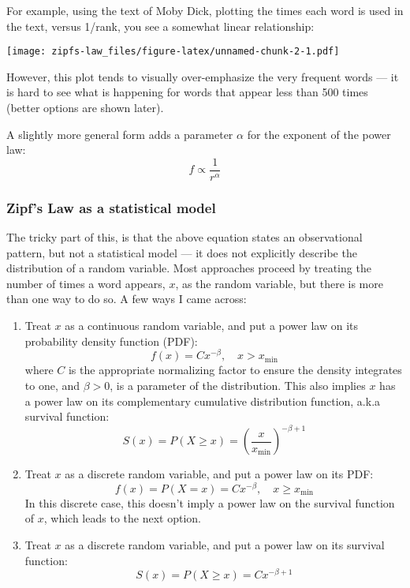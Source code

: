 \documentclass[]{article}
\newenvironment{Shaded}{\begin{snugshade}}{\end{snugshade}}
\newcommand{\DecValTok}[1]{\textcolor[rgb]{0.00,0.00,0.81}{#1}}
\newcommand{\KeywordTok}[1]{\textcolor[rgb]{0.13,0.29,0.53}{\textbf{#1}}}
\newcommand{\NormalTok}[1]{#1}
\newcommand{\OperatorTok}[1]{\textcolor[rgb]{0.81,0.36,0.00}{\textbf{#1}}}
\newcommand{\StringTok}[1]{\textcolor[rgb]{0.31,0.60,0.02}{#1}}
\begin{document}
For example, using the text of Moby Dick, plotting the times each word
is used in the text, versus 1/rank, you see a somewhat linear
relationship:

\begin{Shaded}
\end{Shaded}

\texttt{[image: zipfs-law\_files/figure-latex/unnamed-chunk-2-1.pdf]}

However, this plot tends to visually over-emphasize the very frequent
words --- it is hard to see what is happening for words that appear less
than 500 times (better options are shown later).

A slightly more general form adds a parameter \(\alpha\) for the
exponent of the power law: \[
f \propto \frac{1}{r^\alpha}
\]

\hypertarget{zipfs-law-as-a-statistical-model}{%
\subsubsection{Zipf's Law as a statistical
model}\label{zipfs-law-as-a-statistical-model}}

The tricky part of this, is that the above equation states an
observational pattern, but not a statistical model --- it does not
explicitly describe the distribution of a random variable. Most
approaches proceed by treating the number of times a word appears,
\(x\), as the random variable, but there is more than one way to do so.
A few ways I came across:

\begin{enumerate}
\def\labelenumi{\arabic{enumi}.}
\item
  Treat \(x\) as a continuous random variable, and put a power law on
  its probability density function (PDF): \[
   f(x) = C x^{-\beta}, \quad x > x_\text{min}
   \] where \(C\) is the appropriate normalizing factor to ensure the
  density integrates to one, and \(\beta > 0\), is a parameter of the
  distribution. This also implies \(x\) has a power law on its
  complementary cumulative distribution function, a.k.a survival
  function: \[
   S(x) = P(X \ge x) =  \left(\frac{x}{x_\text{min}}\right)^{-\beta + 1}
   \]
\item
  Treat \(x\) as a discrete random variable, and put a power law on its
  PDF: \[
   f(x) = P(X = x) = C x^{-\beta}, \quad x \ge x_\text{min}
   \] In this discrete case, this doesn't imply a power law on the
  survival function of \(x\), which leads to the next option.
\item
  Treat \(x\) as a discrete random variable, and put a power law on its
  survival function: \[
   S(x) = P(X \ge x) = C x^{-\beta + 1}
   \]
\end{enumerate}
\end{document}
